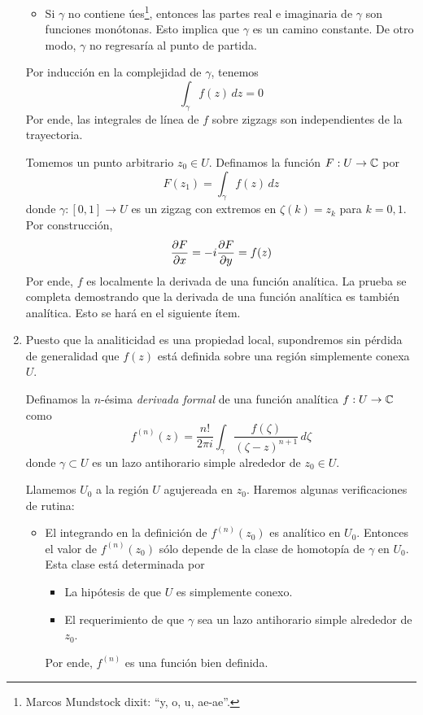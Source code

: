 \begin{solution}
\begin{enumerate}[label=(\alph*)]
\begin{itemize}
        \item Si $\gamma$ no contiene úes\footnote{Marcos Mundstock dixit: ``y, o, u, ae-ae''.}, entonces las partes real e imaginaria de $\gamma$ son funciones monótonas. Esto implica que $\gamma$ es un camino constante. De otro modo, $\gamma$ no regresaría al punto de partida.
    \end{itemize}
    
    Por inducción en la complejidad de $\gamma$, tenemos
    $$\int_\gamma f(z) \, dz = 0$$
    Por ende, las integrales de línea de $f$ sobre zigzags son independientes de la trayectoria.
    
    Tomemos un punto arbitrario $z_0 \in U$. Definamos la función $F : U \to \mathbb C$ por
    $$F(z_1) = \int_\gamma f(z) \, dz$$
    donde $\gamma : [0,1] \to U$ es un zigzag con extremos en $\zeta(k) = z_k$ para $k = 0, 1$. Por construcción,
    $$\dfrac {\partial F} {\partial x} = -i \dfrac {\partial F} {\partial y} = f(z)$$
    Por ende, $f$ es localmente la derivada de una función analítica. La prueba se completa demostrando que la derivada de una función analítica es también analítica. Esto se hará en el siguiente ítem.
    
    \item Puesto que la analiticidad es una propiedad local, supondremos sin pérdida de generalidad que $f(z)$ está definida sobre una región simplemente conexa $U$.
    
    Definamos la $n$-ésima \textit{derivada formal} de una función analítica $f : U \to \mathbb C$ como
    $$f^{(n)}(z) = \frac {n!} {2\pi i} \int_\gamma \frac {f(\zeta)} {(\zeta - z)^{n+1}} \, d\zeta$$
    donde $\gamma \subset U$ es un lazo antihorario simple alrededor de $z_0 \in U$.
    
    Llamemos $U_0$ a la región $U$ agujereada en $z_0$. Haremos algunas verificaciones de rutina:
    \begin{itemize}
        \item El integrando en la definición de $f^{(n)}(z_0)$ es analítico en $U_0$. Entonces el valor de $f^{(n)}(z_0)$ sólo depende de la clase de homotopía de $\gamma$ en $U_0$. Esta clase está determinada por
        \begin{itemize}
            \item La hipótesis de que $U$ es simplemente conexo.
            \item El requerimiento de que $\gamma$ sea un lazo antihorario simple alrededor de $z_0$.
        \end{itemize}
        
        Por ende, $f^{(n)}$ es una función bien definida.
        

\end{itemize}
\end{enumerate}
\end{solution}
